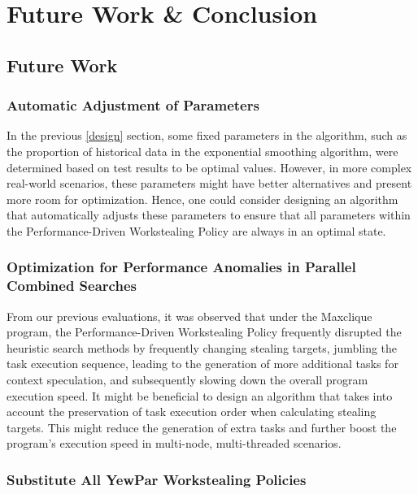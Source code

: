 \documentclass{mproj}
\begin{document}

\chapter{Future Work \& Conclusion}\label{conclusion}

\section{Future Work}

\subsection{Automatic Adjustment of Parameters}

In the previous \ref{design} section,
some fixed parameters in the algorithm, such as the proportion of historical data in the exponential smoothing algorithm,
were determined based on test results to be optimal values.
However, in more complex real-world scenarios,
these parameters might have better alternatives and present more room for optimization.
Hence, one could consider designing an algorithm that automatically adjusts these parameters
to ensure that all parameters within the Performance-Driven Workstealing Policy are always in an optimal state.

\subsection{Optimization for Performance Anomalies in Parallel Combined Searches}

From our previous evaluations, it was observed that under the Maxclique program,
the Performance-Driven Workstealing Policy frequently disrupted the heuristic search methods by frequently changing stealing targets,
jumbling the task execution sequence,
leading to the generation of more additional tasks for context speculation,
and subsequently slowing down the overall program execution speed.
It might be beneficial to design an algorithm that takes into account the preservation of task execution order when calculating stealing targets.
This might reduce the generation of extra tasks and further boost the program's execution speed in multi-node, multi-threaded scenarios.

\subsection{Substitute All YewPar Workstealing Policies}
\end{document}
